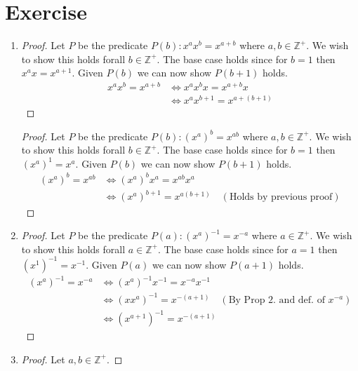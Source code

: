 \documentclass{article}
\begin{document}
\section{Exercise}
\begin{enumerate}[label=(\alph*)]
    \item 
    \begin{proof}
        Let $P$ be the predicate $P(b): x^a x^b = x^{a + b}$ where $a, b \in
        \mathbb{Z}^+$. We wish to show this holds forall $b \in \mathbb{Z}^+$.
        The base case holds since for $b = 1$ then $x^a x = x^{a + 1}$. Given
        $P(b)$ we can now show $P(b + 1)$ holds.
        \begin{align*}
            x^a x^b = x^{a + b} &\iff x^a x^bx = x^{a + b}x \\
            &\iff x^a x^{b + 1} = x^{a + (b + 1)}
        \end{align*}
    \end{proof}

    \begin{proof}
        Let $P$ be the predicate $P(b): (x^a)^b = x^{ab}$ where $a, b \in
        \mathbb{Z}^+$. We wish to show this holds forall $b \in \mathbb{Z}^+$.
        The base case holds since for $b = 1$ then $(x^a)^1 = x^{a}$. Given
        $P(b)$ we can now show $P(b + 1)$ holds.
        \begin{align*}
            (x^a)^b = x^{ab} &\iff (x^a)^b x^a = x^{ab} x^a \\
            &\iff (x^a)^{b + 1}  = x^{a(b + 1)} \quad (\text{Holds by previous proof})
        \end{align*}
    \end{proof}
    \item 
    \begin{proof}
        Let $P$ be the predicate $P(a): (x^a)^{-1} = x^{-a}$ where $a \in
        \mathbb{Z}^+$. We wish to show this holds forall $a \in \mathbb{Z}^+$.
        The base case holds since for $a = 1$ then $(x^1)^{-1} = x^{-1}$. Given
        $P(a)$ we can now show $P(a + 1)$ holds.
        \begin{align*}
            (x^a)^{-1} = x^{-a} &\iff (x^a)^{-1} x^{-1} = x^{-a}x^{-1} \\
            &\iff (x x^a)^{-1} = x^{-(a + 1)} \quad (\text{By Prop 2. and def. of } x^{-a}) \\
            &\iff (x^{a + 1})^{-1} = x^{-(a + 1)}
        \end{align*}
    \end{proof}
    \item
    \begin{proof}
        Let $a, b \in \mathbb{Z}^+$.
    \end{proof}
\end{enumerate}
\end{document}
